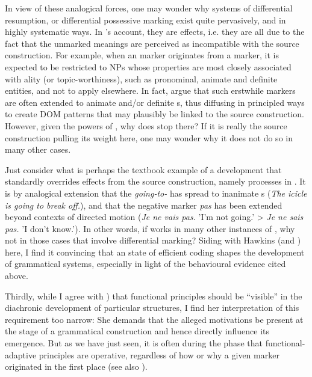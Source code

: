 \documentclass[output=paper]{langsci/langscibook}
\begin{document}
In view of these analogical forces, one may wonder why systems of differential resumption,  or differential possessive marking exist quite pervasively, and in highly systematic ways. In ’s account, they are  effects, i.e. they are all due to the fact that the unmarked meanings are perceived as incompatible with the source construction. For example, when an  marker originates from a  marker, it is expected to be restricted to  NPs whose properties are most closely associated with ality (or topic-worthiness), such as pronominal, animate and definite entities, and not to apply elsewhere. In fact, \citet{DalrympleNikolaeva2011} argue that such erstwhile  markers are often extended to animate and/or definite s, thus diffusing in principled ways to create DOM patterns that may plausibly be linked to the source construction. However, given the powers of , why does  stop there? If it is really the source construction pulling its weight here, one may wonder why it does not do so in many other cases. 

Just consider what is perhaps the textbook example of a development that standardly overrides effects from the source construction, namely  processes in . It is by analogical extension that the \textit{going-to-} has spread to inanimate s (\textit{The icicle is going to break off.}), and that the  negative marker \textit{pas} has been extended beyond contexts of directed motion (\textit{Je ne vais pas.} 'I'm not going.' > \textit{Je ne sais pas.} 'I don't know.'). In other words, if  works in many other instances of , why not in those cases that involve differential marking? Siding with Hawkins (and ) here, I find it convincing that an  state of efficient coding shapes the development of grammatical systems, especially in light of the behavioural evidence cited above.

Thirdly, while I agree with ) that functional principles should be “visible” in the diachronic development of particular structures, I find her interpretation of this requirement too narrow: She demands that the alleged motivations be present at the  stage of a grammatical construction and hence directly influence its emergence. But as we have just seen, it is often during the  phase that functional-adaptive principles are operative, regardless of how or why a given marker originated in the first place (see also ). 
\end{document}
